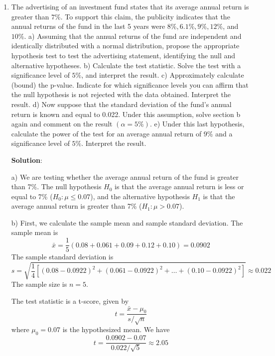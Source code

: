 \documentclass[12pt]{article}
\begin{document}
\begin{enumerate}
{}


\item The advertising of an investment fund states that its average annual return is greater than $7\%$. To support this claim, the publicity indicates that the annual returns of the fund in the last 5 years were $8\%, 6.1\%, 9\%, 12\%$, and $10\%$.
            \newline
            a) Assuming that the annual returns of the fund are independent and identically distributed with a normal distribution, propose the appropriate hypothesis test to test the advertising statement, identifying the null and alternative hypotheses.
            \newline
            b) Calculate the test statistic. Solve the test with a significance level of $5\%$, and interpret the result.
            \newline
            c) Approximately calculate (bound) the p-value. Indicate for which significance levels you can affirm that the null hypothesis is not rejected with the data obtained. Interpret the result.
            \newline
            d) Now suppose that the standard deviation of the fund's annual return is known and equal to 0.022. Under this assumption, solve section b again and comment on the result $(\alpha = 5\%)$.
            \newline
            e) Under this last hypothesis, calculate the power of the test for an average annual return of $9\%$ and a significance level of $5\%$. Interpret the result.

            {\color{blue}
	\textbf{Solution}:
	
	a) We are testing whether the average annual return of the fund is greater than 7\%. The null hypothesis $H_0$ is that the average annual return is less or equal to 7\% ($H_0: \mu \le 0.07$), and the alternative hypothesis $H_1$ is that the average annual return is greater than 7\% ($H_1: \mu > 0.07$).\medskip
	
	b) First, we calculate the sample mean and sample standard deviation. The sample mean is 
	$$\bar{x} = \frac{1}{5}(0.08 + 0.061 + 0.09 + 0.12 + 0.10) = 0.0902$$
	The sample standard deviation is 
	$$s = \sqrt{\frac{1}{4}\left[(0.08-0.0922)^2 + (0.061-0.0922)^2 + \ldots + (0.10-0.0922)^2\right]} \approx 0.022$$
	The sample size is $n=5$.\medskip
	
	The test statistic is a t-score, given by 
	$$t = \frac{\bar{x} - \mu_0}{s/\sqrt{n}}$$
	where $\mu_0 = 0.07$ is the hypothesized mean. We have 
	$$t = \frac{0.0902 - 0.07}{0.022/\sqrt{5}} \approx 2.05$$
	
}
\end{enumerate}
\end{document}
